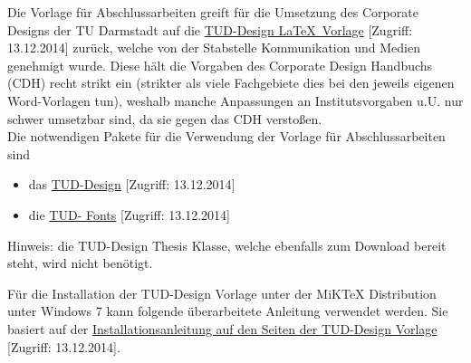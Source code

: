 Die Vorlage für Abschlussarbeiten greift für die Umsetzung des Corporate Designs der TU Darmstadt auf die \href{http://exp1.fkp.physik.tu-darmstadt.de/tuddesign/}{TUD-Design \LaTeX\ Vorlage} [Zugriff: 13.12.2014] zurück, welche von der Stabstelle Kommunikation und Medien genehmigt wurde. Diese hält die Vorgaben des Corporate Design Handbuchs (CDH) recht strikt ein (strikter als viele Fachgebiete dies bei den jeweils eigenen Word-Vorlagen tun), weshalb manche Anpassungen an Institutsvorgaben u.U. nur schwer umsetzbar sind, da sie gegen das CDH verstoßen.\\
Die notwendigen Pakete für die Verwendung der Vorlage für Abschlussarbeiten sind
\begin{itemize}
	\item das \href{http://exp1.fkp.physik.tu-darmstadt.de/tuddesign/latex/latex-tuddesign/latex-tuddesign_0.0.20100410.zip}{TUD-Design} [Zugriff: 13.12.2014]
	\item die \href{http://exp1.fkp.physik.tu-darmstadt.de/tuddesign/latex/tudfonts-tex/tudfonts-tex_0.0.20090806.zip}{TUD- Fonts} [Zugriff: 13.12.2014]
\end{itemize}
Hinweis: die TUD-Design Thesis Klasse, welche ebenfalls zum Download bereit steht, wird nicht benötigt.

Für die Installation der TUD-Design Vorlage unter der MiKTeX Distribution unter Windows 7 kann folgende überarbeitete Anleitung verwendet werden. Sie basiert auf der \href{http://exp1.fkp.physik.tu-darmstadt.de/tuddesign/Win7_miktex29.html}{Installationsanleitung auf den Seiten der TUD-Design Vorlage} [Zugriff: 13.12.2014].


